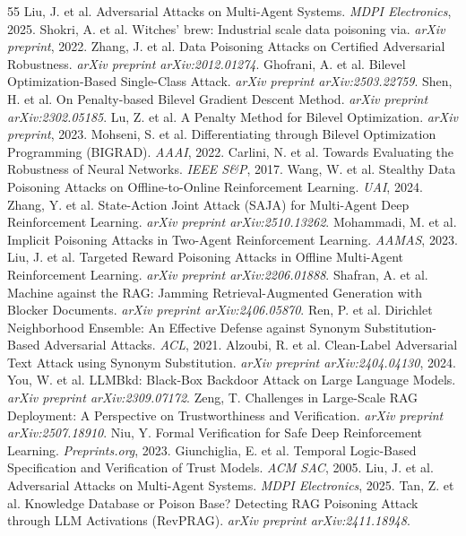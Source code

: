 \documentclass[conference]{IEEEtran}
\begin{document}
\begin{thebibliography}{55}
 Liu, J. et al. Adversarial Attacks on Multi-Agent Systems. \emph{MDPI Electronics}, 2025.
 Shokri, A. et al. Witches' brew: Industrial scale data poisoning via. \emph{arXiv preprint}, 2022.
 Zhang, J. et al. Data Poisoning Attacks on Certified Adversarial Robustness. \emph{arXiv preprint arXiv:2012.01274}.
 Ghofrani, A. et al. Bilevel Optimization-Based Single-Class Attack. \emph{arXiv preprint arXiv:2503.22759}.
 Shen, H. et al. On Penalty-based Bilevel Gradient Descent Method. \emph{arXiv preprint arXiv:2302.05185}.
 Lu, Z. et al. A Penalty Method for Bilevel Optimization. \emph{arXiv preprint}, 2023.
 Mohseni, S. et al. Differentiating through Bilevel Optimization Programming (BIGRAD). \emph{AAAI}, 2022.
 Carlini, N. et al. Towards Evaluating the Robustness of Neural Networks. \emph{IEEE S\&P}, 2017.
 Wang, W. et al. Stealthy Data Poisoning Attacks on Offline-to-Online Reinforcement Learning. \emph{UAI}, 2024.
 Zhang, Y. et al. State-Action Joint Attack (SAJA) for Multi-Agent Deep Reinforcement Learning. \emph{arXiv preprint arXiv:2510.13262}.
 Mohammadi, M. et al. Implicit Poisoning Attacks in Two-Agent Reinforcement Learning. \emph{AAMAS}, 2023.
 Liu, J. et al. Targeted Reward Poisoning Attacks in Offline Multi-Agent Reinforcement Learning. \emph{arXiv preprint arXiv:2206.01888}.
 Shafran, A. et al. Machine against the RAG: Jamming Retrieval-Augmented Generation with Blocker Documents. \emph{arXiv preprint arXiv:2406.05870}.
 Ren, P. et al. Dirichlet Neighborhood Ensemble: An Effective Defense against Synonym Substitution-Based Adversarial Attacks. \emph{ACL}, 2021.
 Alzoubi, R. et al. Clean-Label Adversarial Text Attack using Synonym Substitution. \emph{arXiv preprint arXiv:2404.04130}, 2024.
 You, W. et al. LLMBkd: Black-Box Backdoor Attack on Large Language Models. \emph{arXiv preprint arXiv:2309.07172}.
 Zeng, T. Challenges in Large-Scale RAG Deployment: A Perspective on Trustworthiness and Verification. \emph{arXiv preprint arXiv:2507.18910}.
 Niu, Y. Formal Verification for Safe Deep Reinforcement Learning. \emph{Preprints.org}, 2023.
 Giunchiglia, E. et al. Temporal Logic-Based Specification and Verification of Trust Models. \emph{ACM SAC}, 2005.
 Liu, J. et al. Adversarial Attacks on Multi-Agent Systems. \emph{MDPI Electronics}, 2025.
 Tan, Z. et al. Knowledge Database or Poison Base? Detecting RAG Poisoning Attack through LLM Activations (RevPRAG). \emph{arXiv preprint arXiv:2411.18948}.

\end{thebibliography}
\end{document}
